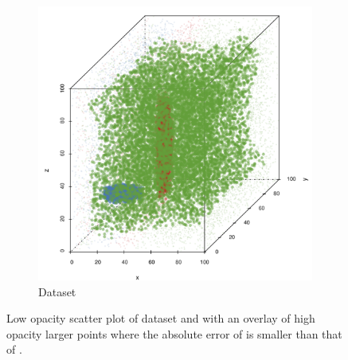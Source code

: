 \begin{figure}
\begin{subfigure}{0.23\textwidth}
			\includegraphics[keepaspectratio=true, width=\textwidth, height=0.23\textheight]{discussion/img/baakman_2_abs_error_mbeSmallerThansambe}
			\caption{Dataset \baakmanTwo}
			\label{fig:discussion:multisphere:mbeLowerError:baakman2}
		\end{subfigure}	
		\caption{Low opacity scatter plot of dataset  \ferdosiTwo and  \baakmanTwo with an overlay of high opacity larger points where the absolute error of \mbe is smaller than that of \sambe.}
		\label{fig:discussion:multisphere:two:mbeLowerError}
	\end{figure}

